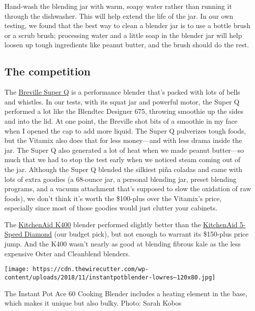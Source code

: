 Hand-wash the blending jar with warm, soapy water rather than running it
through the dishwasher. This will help extend the life of the jar. In
our own testing, we found that the best way to clean a blender jar is to
use a bottle brush or a scrub brush; processing water and a little soap
in the blender jar will help loosen up tough ingredients like peanut
butter, and the brush should do the rest.

\hypertarget{the-competition}{%
\subsection{The competition}\label{the-competition}}

The
\href{https://www.nytimes3xbfgragh.onion/wirecutter/out/link/34557/156463/4/109200/?merchant=Amazon}{Breville
Super Q} is a performance blender that's packed with lots of bells and
whistles. In our tests, with its squat jar and powerful motor, the Super
Q performed a lot like the Blendtec Designer 675, throwing smoothie up
the sides and into the lid. At one point, the Breville shot bits of a
smoothie in my face when I opened the cap to add more liquid. The Super
Q pulverizes tough foods, but the Vitamix also does that for less
money---and with less drama inside the jar. The Super Q also generated a
lot of heat when we made peanut butter---so much that we had to stop the
test early when we noticed steam coming out of the jar. Although the
Super Q blended the silkiest piña coladas and came with lots of extra
goodies (a 68-ounce jar, a personal blending jar, preset blending
programs, and a vacuum attachment that's supposed to slow the oxidation
of raw foods), we don't think it's worth the \$100-plus over the
Vitamix's price, especially since most of those goodies would just
clutter your cabinets.

The
\href{https://www.nytimes3xbfgragh.onion/wirecutter/out/link/35381/157534/4/103356/?merchant=Amazon}{KitchenAid
K400} blender performed slightly better than the
\protect\hyperlink{budget-pick-kitchenaid-5-speed-diamond-blender}{KitchenAid
5-Speed Diamond} (our budget pick), but not enough to warrant its
\$150-plus price jump. And the K400 wasn't nearly as good at blending
fibrous kale as the less expensive Oster and Cleanblend blenders.

\texttt{[image: https://cdn.thewirecutter.com/wp-content/uploads/2018/11/instantpotblender-lowres--120x80.jpg]}

The Instant Pot Ace 60 Cooking Blender includes a heating element in the
base, which makes it unique but also bulky. Photo: Sarah Kobos

